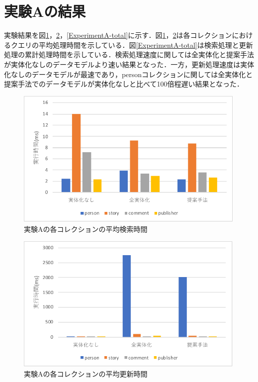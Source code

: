 \documentclass[a4paper,11pt]{ujreport}
\begin{document}
\section{実験Aの結果}
実験結果を図\ref{ExperimentA-find}，\ref{ExperimentA-update}，\ref{ExperimentA-total}に示す．図\ref{ExperimentA-find}，\ref{ExperimentA-update}は各コレクションにおけるクエリの平均処理時間を示している．図\ref{ExperimentA-total}は検索処理と更新処理の累計処理時間を示している．検索処理速度に関しては全実体化と提案手法が実体化なしのデータモデルより速い結果となった．一方，更新処理速度は実体化なしのデータモデルが最速であり，personコレクションに関しては全実体化と提案手法でのデータモデルが実体化なしと比べて100倍程遅い結果となった．
\begin{figure}[htbp]
	\begin{center}
		\includegraphics[width=30em]{src/ExperimentA-find.pdf} %
	\end{center}
	\caption{実験Aの各コレクションの平均検索時間}
	\label{ExperimentA-find}
\end{figure}
\begin{figure}[htbp]
	\begin{center}
		\includegraphics[width=30em]{src/ExperimentA-update.pdf} %
	\end{center}
	\caption{実験Aの各コレクションの平均更新時間}
	\label{ExperimentA-update}
\end{figure}
\end{document}
